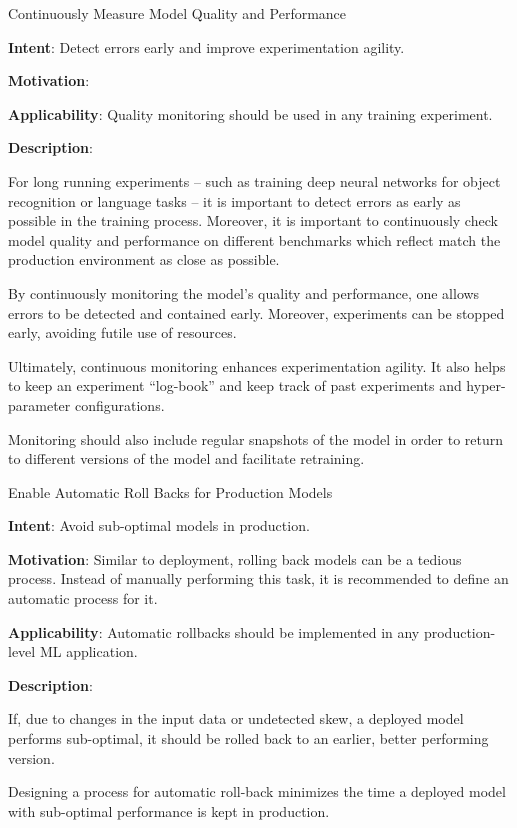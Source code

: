   
  \begin{frame}[plain]{ Continuously Measure Model Quality and Performance
 }

  \textbf{Intent}: Detect errors early and improve experimentation agility. 
 

  \textbf{Motivation}: 
 

  \textbf{Applicability}: Quality monitoring should be used in any training experiment.
 

  \textbf{Description}: 

For long running experiments -- such as training deep neural networks for object recognition or language tasks -- it is important to detect errors as early as possible in the training process.
Moreover, it is important to continuously check model quality and performance on different benchmarks which reflect match the production environment as close as possible.


By continuously monitoring the model's quality and performance, one allows errors to be detected and contained early.
Moreover, experiments can be stopped early, avoiding futile use of resources.


Ultimately, continuous monitoring enhances experimentation agility.
It also helps to keep an experiment ``log-book'' and keep track of past experiments and hyper-parameter configurations.


Monitoring should also include regular snapshots of the model in order to return to different versions of the model and facilitate retraining.


 


  \end{frame}

  
  \begin{frame}[plain]{ Enable Automatic Roll Backs for Production Models
 }

  \textbf{Intent}: Avoid sub-optimal models in production. 
 

  \textbf{Motivation}: Similar to deployment, rolling back models can be a tedious process. Instead of manually performing this task, it is recommended to define an automatic process for it. 
 

  \textbf{Applicability}: Automatic rollbacks should be implemented in any production-level ML application.
 

  \textbf{Description}: 

If, due to changes in the input data or undetected skew, a deployed model performs sub-optimal, it should be rolled back to an earlier, better performing version.


Designing a process for automatic roll-back minimizes the time a deployed model with sub-optimal performance is kept in production.


 


  \end{frame}


